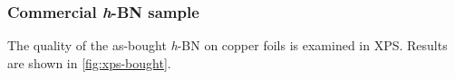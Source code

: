 \subsubsection{Commercial \textit{h}-BN sample}
The quality of the as-bought \textit{h}-BN on copper foils\cite{_graphene_2014} is examined in XPS. Results are shown in \autoref{fig:xps-bought}.
\begin{figure}[!h]
	\centering
\end{figure}
